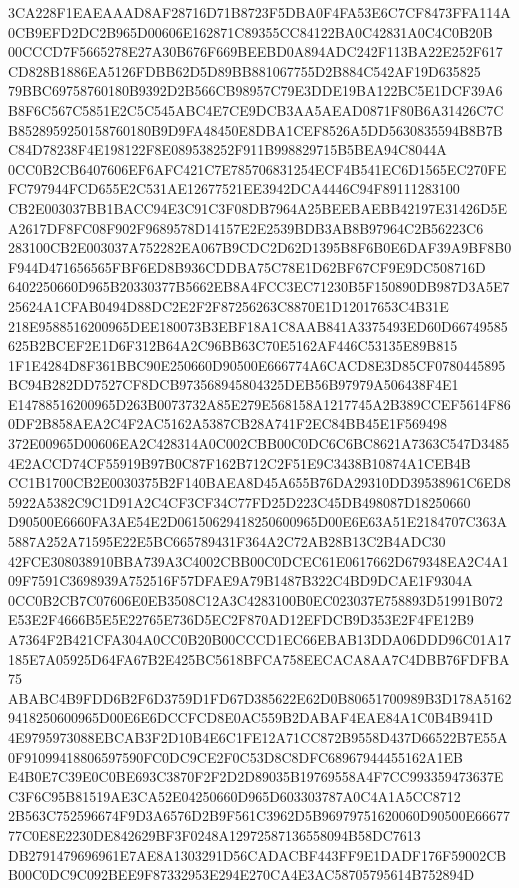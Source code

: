 \documentclass[UTF8,fontset=fandol,zihao=-4,a4paper]{ctexart}
\begin{document}
{{3CA228F1EAEAAAD8AF28716D71B8723F5DBA0F4FA53E6C7CF8473FFA114A0CB9EFD2DC2B965D00606E162871C89355CC84122BA0C42831A0C4C0B20B
00CCCD7F5665278E27A30B676F669BEEBD0A894ADC242F113BA22E252F617CD828B1886EA5126FDBB62D5D89BB881067755D2B884C542AF19D635825
79BBC69758760180B9392D2B566CB98957C79E3DDE19BA122BC5E1DCF39A6B8F6C567C5851E2C5C545ABC4E7CE9DCB3AA5AEAD0871F80B6A31426C7C
B8528959250158760180B9D9FA48450E8DBA1CEF8526A5DD5630835594B8B7BC84D78238F4E198122F8E089538252F911B998829715B5BEA94C8044A
0CC0B2CB6407606EF6AFC421C7E785706831254ECF4B541EC6D1565EC270FEFC797944FCD655E2C531AE12677521EE3942DCA4446C94F89111283100
CB2E003037BB1BACC94E3C91C3F08DB7964A25BEEBAEBB42197E31426D5EA2617DF8FC08F902F9689578D14157E2E2539BDB3AB8B97964C2B56223C6
283100CB2E003037A752282EA067B9CDC2D62D1395B8F6B0E6DAF39A9BF8B0F944D471656565FBF6ED8B936CDDBA75C78E1D62BF67CF9E9DC508716D
6402250660D965B20330377B5662EB8A4FCC3EC71230B5F150890DB987D3A5E725624A1CFAB0494D88DC2E2F2F87256263C8870E1D12017653C4B31E
218E9588516200965DEE180073B3EBF18A1C8AAB841A3375493ED60D66749585625B2BCEF2E1D6F312B64A2C96BB63C70E5162AF446C53135E89B815
1F1E4284D8F361BBC90E250660D90500E666774A6CACD8E3D85CF0780445895BC94B282DD7527CF8DCB973568945804325DEB56B97979A506438F4E1
E14788516200965D263B0073732A85E279E568158A1217745A2B389CCEF5614F860DF2B858AEA2C4F2AC5162A5387CB28A741F2EC84BB45E1F569498
372E00965D00606EA2C428314A0C002CBB00C0DC6C6BC8621A7363C547D34854E2ACCD74CF55919B97B0C87F162B712C2F51E9C3438B10874A1CEB4B
CC1B1700CB2E0030375B2F140BAEA8D45A655B76DA29310DD39538961C6ED85922A5382C9C1D91A2C4CF3CF34C77FD25D223C45DB498087D18250660
D90500E6660FA3AE54E2D06150629418250600965D00E6E63A51E2184707C363A5887A252A71595E22E5BC665789431F364A2C72AB28B13C2B4ADC30
42FCE308038910BBA739A3C4002CBB00C0DCEC61E0617662D679348EA2C4A109F7591C3698939A752516F57DFAE9A79B1487B322C4BD9DCAE1F9304A
0CC0B2CB7C07606E0EB3508C12A3C4283100B0EC023037E758893D51991B072E53E2F4666B5E5E22765E736D5EC2F870AD12EFDCB9D353E2F4FE12B9
A7364F2B421CFA304A0CC0B20B00CCCD1EC66EBAB13DDA06DDD96C01A17185E7A05925D64FA67B2E425BC5618BFCA758EECACA8AA7C4DBB76FDFBA75
ABABC4B9FDD6B2F6D3759D1FD67D385622E62D0B80651700989B3D178A51629418250600965D00E6E6DCCFCD8E0AC559B2DABAF4EAE84A1C0B4B941D
4E9795973088EBCAB3F2D10B4E6C1FE12A71CC872B9558D437D66522B7E55A0F91099418806597590FC0DC9CE2F0C53D8C8DFC68967944455162A1EB
E4B0E7C39E0C0BE693C3870F2F2D2D89035B19769558A4F7CC993359473637EC3F6C95B81519AE3CA52E04250660D965D603303787A0C4A1A5CC8712
2B563C752596674F9D3A6576D2B9F561C3962D5B96979751620060D90500E6667777C0E8E2230DE842629BF3F0248A12972587136558094B58DC7613
DB2791479696961E7AE8A1303291D56CADACBF443FF9E1DADF176F59002CBB00C0DC9C092BEE9F87332953E294E270CA4E3AC58705795614B752894D
}}
\end{document}
